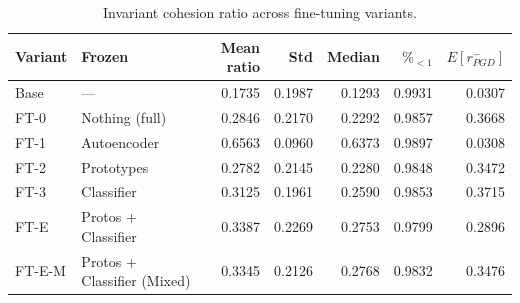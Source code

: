 \begin{table}
\caption{Invariant cohesion ratio across fine-tuning variants.}
\label{tab:ch6_cohesion_table_B30}
\begin{tabular}{llrrrrr}
\toprule
Variant & Frozen & Mean ratio & Std & Median & $\%_{<1}$ & $E[r_{PGD}^-]$ \\
\midrule
Base & — & 0.1735 & 0.1987 & 0.1293 & 0.9931 & 0.0307 \\
FT-0 & Nothing (full) & 0.2846 & 0.2170 & 0.2292 & 0.9857 & 0.3668 \\
FT-1 & Autoencoder & 0.6563 & 0.0960 & 0.6373 & 0.9897 & 0.0308 \\
FT-2 & Prototypes & 0.2782 & 0.2145 & 0.2280 & 0.9848 & 0.3472 \\
FT-3 & Classifier & 0.3125 & 0.1961 & 0.2590 & 0.9853 & 0.3715 \\
FT-E & Protos + Classifier & 0.3387 & 0.2269 & 0.2753 & 0.9799 & 0.2896 \\
FT-E-M & Protos + Classifier (Mixed) & 0.3345 & 0.2126 & 0.2768 & 0.9832 & 0.3476 \\
\bottomrule
\end{tabular}
\end{table}
